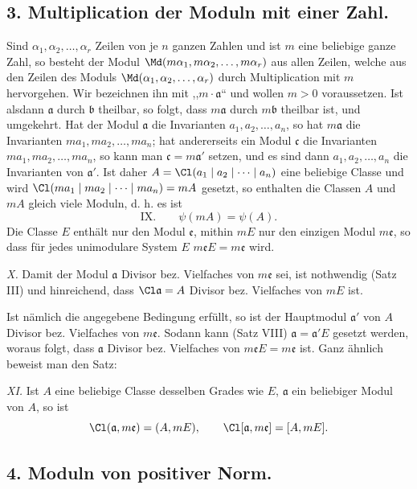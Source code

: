 \subsection*{3. Multiplication der Moduln mit einer Zahl.}

Sind $\alpha_1,\alpha_2,\ldots,\alpha_r$ Zeilen von je $n$ ganzen Zahlen und ist $m$ eine beliebige ganze Zahl, so besteht der Modul $\Md(m\alpha_1,m\alpha_2,\ldots,m\alpha_r)$ aus allen Zeilen, welche aus den Zeilen des Moduls $\Md(\alpha_1,\alpha_2,\ldots,\alpha_r)$ durch Multiplication mit $m$ hervorgehen. Wir bezeichnen ihn mit ,,$m\cdot\mathfrak a$`` und wollen $m>0$ voraussetzen. Ist alsdann $\mathfrak a$ durch $\mathfrak b$ theilbar, so folgt, dass $m\mathfrak a$ durch $m\mathfrak b$ theilbar ist, und umgekehrt. Hat der Modul $\mathfrak a$ die Invarianten $a_1,a_2,\ldots,a_n$, so hat $m\mathfrak a$ die Invarianten $ma_1,ma_2,\ldots,ma_n$; hat andererseits ein Modul $\mathfrak c$ die Invarianten $ma_1,ma_2,\ldots,ma_n$, so kann man $\mathfrak c=m\mathfrak a'$ setzen, und es sind dann $a_1,a_2,\ldots,a_n$ die Invarianten von $\mathfrak a'$. Ist daher $A=\Cl(a_1\mid a_2\mid\cdots\mid a_n)$ eine beliebige Classe und wird $\Cl(ma_1\mid ma_2\mid\cdots\mid ma_n)=mA$ gesetzt, so enthalten die Classen $A$ und $mA$ gleich viele Moduln, d. h. es ist
\[
\text{IX.}\qquad \psi(mA)=\psi(A).
\]
Die Classe $E$ enthält nur den Modul $\mathfrak e$, mithin $mE$ nur den einzigen Modul $m\mathfrak e$, so dass für jedes unimodulare System $E$ $m\mathfrak eE=m\mathfrak e$ wird.

\emph{X.} Damit der Modul $\mathfrak a$ Divisor bez. Vielfaches von $m\mathfrak e$ sei, ist nothwendig (Satz III) und hinreichend, dass $\Cl\mathfrak a=A$ Divisor bez. Vielfaches von $mE$ ist.

Ist nämlich die angegebene Bedingung erfüllt, so ist der Hauptmodul $\mathfrak a'$ von $A$ Divisor bez. Vielfaches von $m\mathfrak e$. Sodann kann (Satz VIII) $\mathfrak a=\mathfrak a'E$ gesetzt werden, woraus folgt, dass $\mathfrak a$ Divisor bez. Vielfaches von $m\mathfrak eE=m\mathfrak e$ ist. Ganz ähnlich beweist man den Satz:

\emph{XI.} Ist $A$ eine beliebige Classe desselben Grades wie $E$, $\mathfrak a$ ein beliebiger Modul von $A$, so ist
\[
 \Cl(\mathfrak a,m\mathfrak e)=(A,mE),
 \qquad
 \Cl[\mathfrak a,m\mathfrak e]=[A,mE].
\]

\subsection*{4. Moduln von positiver Norm.}

